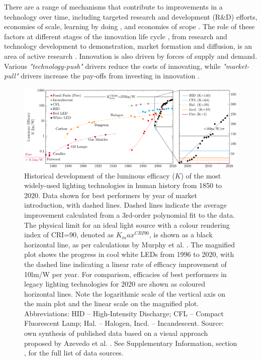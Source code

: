\documentclass[twoside,twocolumn,9pt]{article}
\begin{document}
There are a range of mechanisms that contribute to improvements in a technology over time, including targeted research and development (R\&D) efforts, economies of scale, learning by doing \cite{Arrow1971}, and economies of scope \cite{johansson2012global}\cite{national2016power}\cite{iea2020perspectives}. The role of these factors at different stages of the innovation life cycle \cite{ grubler2012policies}, from research and technology development to demonstration, market formation and diffusion, is an area of active research \cite{Mowery1979} \cite{kavlak2018evaluating} \cite{Ziegler2021}. Innovation is also driven by forces of supply and demand. Various \textit{"technology-push"} drivers reduce the costs of innovating, while \textit{"market-pull"} drivers increase the pay-offs from investing in innovation \cite{anadon2009policy}.

\begin{figure}[h]
 \centering
 \includegraphics[width=\textwidth]{2_SSL_EES/article/figures/history_efficacy.pdf}
 \caption{Historical development of the luminous efficacy ($K$) of the most widely-used lighting technologies in human history from 1850 to 2020. Data shown for best performers by year of market introduction, with dashed lines. Dashed lines indicate the average improvement calculated from a 3rd-order polynomial fit to the data. The physical limit for an ideal light source with a colour rendering index of CRI=90, denoted as $K_max^{CRI90}$, is shown as a black horizontal line, as per calculations by Murphy et al. \cite{Murphy2012}. The magnified plot shows the progress in cool white LEDs from 1996 to 2020, with the dashed line indicating a linear rate of efficacy improvement of 10lm/W per year. For comparison, efficacies of best performers in legacy lighting technologies for 2020 are shown as coloured horizontal lines. Note the logarithmic scale of the vertical axis on the main plot and the linear scale on the magnified plot. Abbreviations: HID – High-Intensity Discharge; CFL – Compact Fluorescent Lamp; Hal. – Halogen, Incd. – Incandescent. Source: own synthesis of published data based on a visual approach proposed by Azevedo et al. \cite{azevedo2009transition}. See Supplementary Information, section , for the full list of data sources. }
 \label{fgr:history_efficacy}
\end{figure}
 
\end{document}

